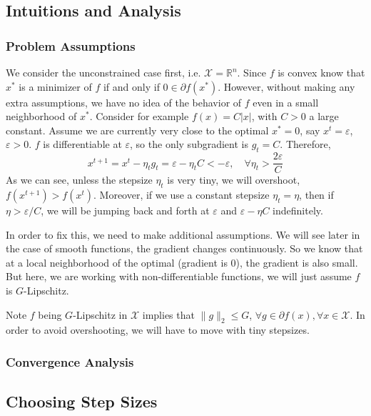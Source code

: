 \documentclass{scrartcl}
\newcommand{\RR}{\mathbb{R}}
\newcommand{\sX}{\mathcal{X}}
\begin{document}
\subsection{Intuitions and Analysis}

\subsubsection{Problem Assumptions}
\label{sec:subgrad-descent-assumption}

We consider the unconstrained case first, i.e. $\sX=\RR^n$. Since $f$ is convex know that $x^*$ is a
minimizer of $f$ if and only if $0\in\partial f (x^*)$. However, without making any extra
assumptions, we have no idea of the behavior of $f$ even in a small neighborhood of $x^*$. Consider
for example $f(x)=C|x|$, with $C>0$ a large constant. Assume we are currently very close to the
optimal $x^*=0$, say $x^t=\varepsilon$, $\varepsilon>0$. $f$ is differentiable at $\varepsilon$, so
the only subgradient is $g_t=C$. Therefore,
\[
  x^{t+1} = x^t - \eta_t g_t
  = \varepsilon - \eta_tC < -\varepsilon, \quad \forall \eta_t > \frac {2\varepsilon} {C}
\]
As we can see, unless the stepsize $\eta_t$ is very tiny, we will overshoot, $f(x^{t+1})>f(x^t)$.
Moreover, if we use a constant stepsize $\eta_t=\eta$, then if $\eta >\varepsilon/C$, we will be
jumping back and forth at $\varepsilon$ and $\varepsilon - \eta C$ indefinitely.

In order to fix this, we need to make additional assumptions. We will see later in the case of
smooth functions, the gradient changes continuously. So we know that at a local neighborhood of the
optimal (gradient is 0), the gradient is also small. But here, we are working with
non-differentiable functions, we will just assume $f$ is $G$-Lipschitz.

Note $f$ being $G$-Lipschitz in $\sX$ implies that $\|g\|_2 \leq G$, $\forall g\in\partial f(x),
\forall x\in\sX$. In order to avoid overshooting, we will have to move with tiny stepsizes.

\subsubsection{Convergence Analysis}
\label{sec:subgrad-lipschitz-analysis}


\subsection{Choosing Step Sizes}
\end{document}
